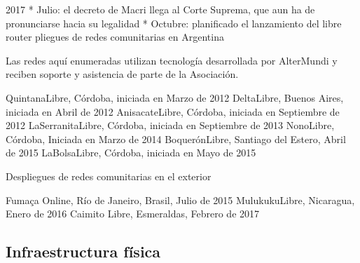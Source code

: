 2017
* Julio: el decreto de Macri llega al Corte Suprema, que aun ha de pronunciarse hacia su legalidad
* Octubre: planificado el lanzamiento del libre router
pliegues de redes comunitarias en Argentina

Las redes aquí enumeradas utilizan tecnología desarrollada por AlterMundi y reciben soporte y asistencia de parte de la Asociación.

QuintanaLibre, Córdoba, iniciada en Marzo de 2012 
DeltaLibre, Buenos Aires, iniciada en Abril de 2012 
AnisacateLibre, Córdoba, iniciada en Septiembre de 2012 
LaSerranitaLibre, Córdoba, iniciada en Septiembre de 2013 
NonoLibre, Córdoba, Iniciada en Marzo de 2014 
BoquerónLibre, Santiago del Estero, Abril de 2015 
LaBolsaLibre, Córdoba, iniciada en Mayo de 2015

Despliegues de redes comunitarias en el exterior

Fumaça Online, Río de Janeiro, Brasil, Julio de 2015
MulukukuLibre, Nicaragua, Enero de 2016
Caimito Libre, Esmeraldas, Febrero de 2017

\subsection{Infraestructura física}

\begin{comment}
[Latour2010]
"the technology.. /digital technology .. makes networks material and explicit" (infrastruktur ist präsent und sichtbar im öffentlichen Raum) --> wem gehört die Infrastruktur? wer kontrolliert die? Wer hat (physischen) Zugang dazu?
"he expansion of digitality has
enormously increased the material dimension of networks: the more digital, the less
virtual and the more material a given activity becomes." <-- das ist das Exaktzitat


"subversion it introduces in the notion of distance (the adjectives “close” and “far” are
made dependant on the presence of conduits, bridges, and hubs)," <-- physical network
\end{comment}

